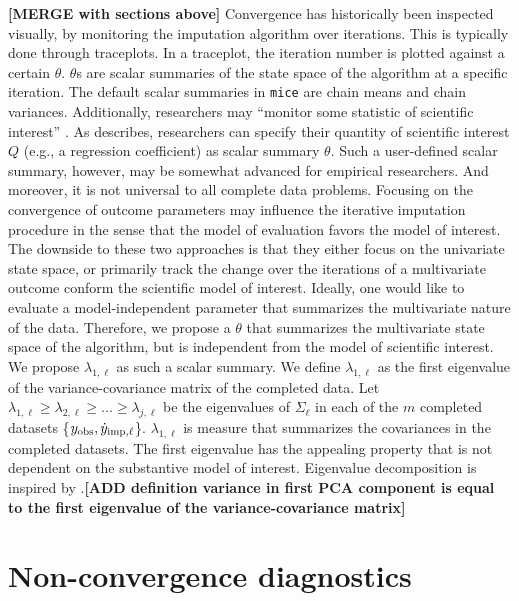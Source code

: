 \documentclass[Royal,times,sageh]{sagej}
\begin{document}
\textbf{{[}MERGE with sections above{]}} Convergence has historically been inspected visually, by monitoring the imputation algorithm over iterations. This is typically done through traceplots. In a traceplot, the iteration number is plotted against a certain \(\theta\). \(\theta\)s are scalar summaries of the state space of the algorithm at a specific iteration. The default scalar summaries in \texttt{mice} are chain means and chain variances. Additionally, researchers may ``monitor some statistic of scientific interest'' \citep[\(\S\) 6.5.2]{buur18}. As \citet{buur18} describes, researchers can specify their quantity of scientific interest \(Q\) (e.g., a regression coefficient) as scalar summary \(\theta\). Such a user-defined scalar summary, however, may be somewhat advanced for empirical researchers. And moreover, it is not universal to all complete data problems. Focusing on the convergence of outcome parameters may influence the iterative imputation procedure in the sense that the model of evaluation favors the model of interest. The downside to these two approaches is that they either focus on the univariate state space, or primarily track the change over the iterations of a multivariate outcome conform the scientific model of interest. Ideally, one would like to evaluate a model-independent parameter that summarizes the multivariate nature of the data. Therefore, we propose a \(\theta\) that summarizes the multivariate state space of the algorithm, but is independent from the model of scientific interest. We propose \(\lambda_{1, \ell}\) as such a scalar summary. We define \(\lambda_{1, \ell}\) as the first eigenvalue of the variance-covariance matrix of the completed data. Let \(\lambda_{1, \ell} \geq \lambda_{2, \ell} \geq ... \geq \lambda_{j, \ell}\) be the eigenvalues of \(\Sigma_\ell\) in each of the \(m\) completed datasets \{\(y_{\rm obs}, \dot y_{\rm imp, \ell}\)\}. \(\lambda_{1, \ell}\) is measure that summarizes the covariances in the completed datasets. The first eigenvalue has the appealing property that is not dependent on the substantive model of interest. Eigenvalue decomposition is inspired by \citet{mack03}.\textbf{{[}ADD definition variance in first PCA component is equal to the first eigenvalue of the variance-covariance matrix{]}}

\hypertarget{non-convergence-diagnostics}{%
\section{Non-convergence diagnostics}\label{non-convergence-diagnostics}}
\end{document}
